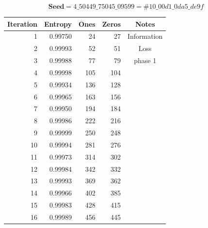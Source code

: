 \documentclass[letterpaper]{article}
\begin{document}
\begin{multicols}{2}
    \begin{table}[ht]
        \centering
        $$\textbf{Seed} = 4\_50449\_75045\_09599 = \#10\_00d1\_0da5\_de9f$$
        \begin{tabular}{|r|r|r|r|c|}
            \hline
            \textbf{Iteration} & \textbf{Entropy} & \textbf{Ones} & \textbf{Zeros} & \textbf{Notes}   \\
            \hline
            1                  & 0.99750          & 24            & 27             & Information \\
            2                  & 0.99993          & 52            & 51             & Loss          \\
            3                  & 0.99988          & 77            & 79             & phase 1                 \\
            4                  & 0.99998          & 105           & 104            &                  \\
            5                  & 0.99934          & 136           & 128            &                  \\
            6                  & 0.99965          & 163           & 156            &                  \\
            7                  & 0.99950          & 194           & 184            &                  \\
            8                  & 0.99986          & 222           & 216            &                  \\
            9                  & 0.99999          & 250           & 248            &                  \\
            10                 & 0.99994          & 281           & 276            &                  \\
            11                 & 0.99973          & 314           & 302            &                  \\
            12                 & 0.99984          & 342           & 332            &                  \\
            13                 & 0.99993          & 369           & 362            &                  \\
            14                 & 0.99966          & 402           & 385            &                  \\
            15                 & 0.99983          & 428           & 415            &                  \\
            16                 & 0.99989          & 456           & 445            &                  \\

\end{tabular}
\end{table}
\end{multicols}
\end{document}
